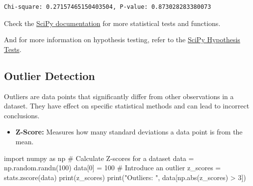 \documentclass[
  letterpaper,
  DIV=11,
  numbers=noendperiod]{scrreprt}
\newenvironment{Shaded}{\begin{snugshade}}{\end{snugshade}}
\newcommand{\BuiltInTok}[1]{\textcolor[rgb]{0.00,0.23,0.31}{#1}}
\newcommand{\CommentTok}[1]{\textcolor[rgb]{0.37,0.37,0.37}{#1}}
\newcommand{\DecValTok}[1]{\textcolor[rgb]{0.68,0.00,0.00}{#1}}
\newcommand{\ImportTok}[1]{\textcolor[rgb]{0.00,0.46,0.62}{#1}}
\newcommand{\NormalTok}[1]{\textcolor[rgb]{0.00,0.23,0.31}{#1}}
\newcommand{\OperatorTok}[1]{\textcolor[rgb]{0.37,0.37,0.37}{#1}}
\newcommand{\StringTok}[1]{\textcolor[rgb]{0.13,0.47,0.30}{#1}}
\providecommand{\tightlist}{%
  \setlength{\itemsep}{0pt}\setlength{\parskip}{0pt}}\usepackage{longtable,booktabs,array}
\begin{document}
\begin{verbatim}
Chi-square: 0.27157465150403504, P-value: 0.873028283380073
\end{verbatim}

Check the
\href{https://docs.scipy.org/doc/scipy/reference/stats.html}{SciPy
documentation} for more statistical tests and functions.

And for more information on hypothesis testing, refer to the
\href{https://docs.scipy.org/doc/scipy/tutorial/stats/hypothesis_tests.html}{SciPy
Hypothesis Tests}.

\subsection*{Outlier Detection}\label{outlier-detection}

Outliers are data points that significantly differ from other
observations in a dataset. They have effect on specific statistical
methods and can lead to incorrect conclusions.

\begin{itemize}
\tightlist
\item
  \textbf{Z-Score:} Measures how many standard deviations a data point
  is from the mean.
\end{itemize}

\begin{Shaded}
\begin{Highlighting}[]
\ImportTok{import}\NormalTok{ numpy }\ImportTok{as}\NormalTok{ np}
\CommentTok{\# Calculate Z{-}scores for a dataset}
\NormalTok{data }\OperatorTok{=}\NormalTok{ np.random.randn(}\DecValTok{100}\NormalTok{)}
\NormalTok{data[}\DecValTok{0}\NormalTok{] }\OperatorTok{=} \DecValTok{100}  \CommentTok{\# Introduce an outlier}
\NormalTok{z\_scores }\OperatorTok{=}\NormalTok{ stats.zscore(data)}
\BuiltInTok{print}\NormalTok{(z\_scores)}
\BuiltInTok{print}\NormalTok{(}\StringTok{"Outliers: "}\NormalTok{, data[np.}\BuiltInTok{abs}\NormalTok{(z\_scores) }\OperatorTok{\textgreater{}} \DecValTok{3}\NormalTok{])}
\end{Highlighting}
\end{Shaded}
\end{document}
